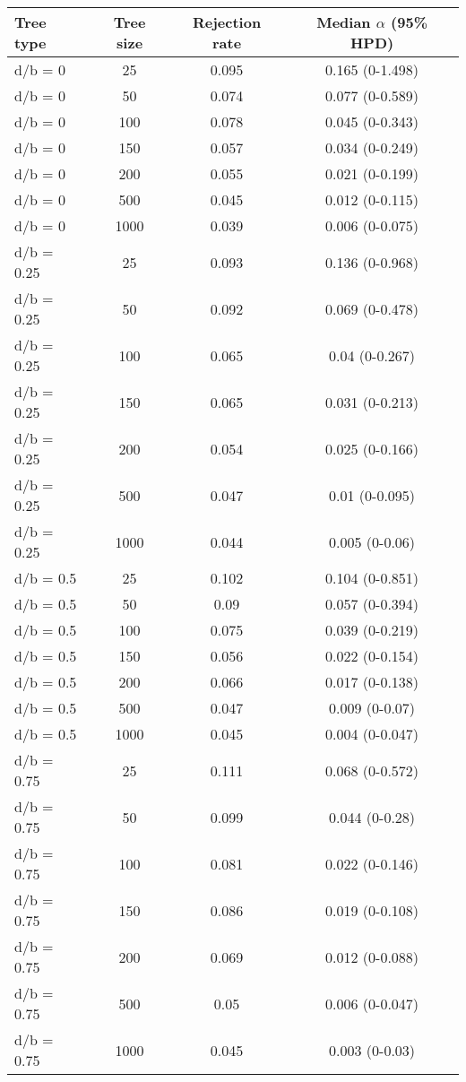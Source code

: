\begin{tabular}{lccc}
     \hline
     \textbf{Tree type} & \textbf{Tree size} & \textbf{Rejection rate}  & \textbf{Median $\alpha$ (95\% HPD)}    \\
     \hline
     d/b = 0 & 25  & 0.095 & 0.165 (0-1.498)   \\
     d/b = 0 & 50  & 0.074 & 0.077 (0-0.589)   \\
     d/b = 0 & 100 & 0.078 & 0.045 (0-0.343)   \\
     d/b = 0 & 150 & 0.057 & 0.034 (0-0.249)   \\
     d/b = 0 & 200 & 0.055 & 0.021 (0-0.199)   \\
     d/b = 0 & 500 & 0.045 & 0.012 (0-0.115)   \\
     d/b = 0 & 1000  & 0.039 & 0.006 (0-0.075)   \\
     d/b = 0.25  & 25  & 0.093 & 0.136 (0-0.968)   \\
     d/b = 0.25  & 50  & 0.092 & 0.069 (0-0.478)   \\
     d/b = 0.25  & 100 & 0.065 & 0.04 (0-0.267)    \\
     d/b = 0.25  & 150 & 0.065 & 0.031 (0-0.213)   \\
     d/b = 0.25  & 200 & 0.054 & 0.025 (0-0.166)   \\
     d/b = 0.25  & 500 & 0.047 & 0.01 (0-0.095)    \\
     d/b = 0.25  & 1000  & 0.044 & 0.005 (0-0.06)    \\
     d/b = 0.5 & 25  & 0.102 & 0.104 (0-0.851)   \\
     d/b = 0.5 & 50  & 0.09  & 0.057 (0-0.394)   \\
     d/b = 0.5 & 100 & 0.075 & 0.039 (0-0.219)   \\
     d/b = 0.5 & 150 & 0.056 & 0.022 (0-0.154)   \\
     d/b = 0.5 & 200 & 0.066 & 0.017 (0-0.138)   \\
     d/b = 0.5 & 500 & 0.047 & 0.009 (0-0.07)    \\
     d/b = 0.5 & 1000  & 0.045 & 0.004 (0-0.047)   \\
     d/b = 0.75  & 25  & 0.111 & 0.068 (0-0.572)   \\
     d/b = 0.75  & 50  & 0.099 & 0.044 (0-0.28)    \\
     d/b = 0.75  & 100 & 0.081 & 0.022 (0-0.146)   \\
     d/b = 0.75  & 150 & 0.086 & 0.019 (0-0.108)   \\
     d/b = 0.75  & 200 & 0.069 & 0.012 (0-0.088)   \\
     d/b = 0.75  & 500 & 0.05  & 0.006 (0-0.047)   \\
     d/b = 0.75  & 1000  & 0.045 & 0.003 (0-0.03)    \\
     \hline
\end{tabular}